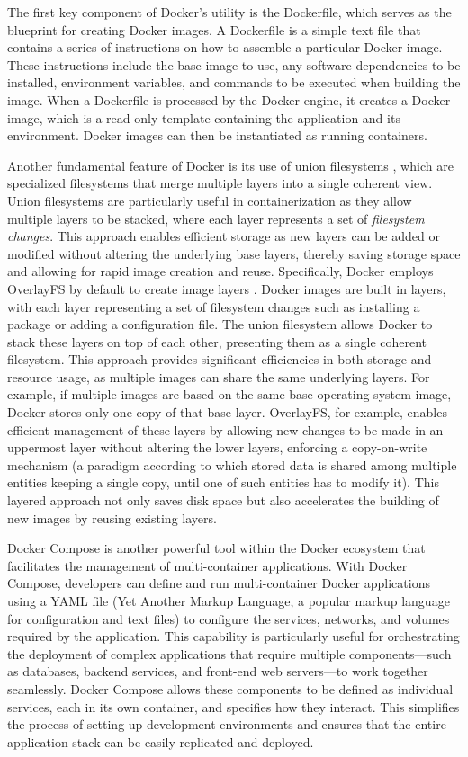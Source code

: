 The first key component of Docker's utility is the Dockerfile, which serves as the blueprint for creating Docker images. A Dockerfile is a simple text file that contains a series of instructions on how to assemble a particular Docker image. These instructions include the base image to use, any software dependencies to be installed, environment variables, and commands to be executed when building the image. When a Dockerfile is processed by the Docker engine, it creates a Docker image, which is a read-only template containing the application and its environment. Docker images can then be instantiated as running containers.

Another fundamental feature of Docker is its use of union filesystems \cite{dua_performance_2016}, which are specialized filesystems that merge multiple layers into a single coherent view. Union filesystems are particularly useful in containerization as they allow multiple layers to be stacked, where each layer represents a set of \emph{filesystem changes}. This approach enables efficient storage as new layers can be added or modified without altering the underlying base layers, thereby saving storage space and allowing for rapid image creation and reuse. Specifically, Docker employs OverlayFS by default to create image layers \cite{mizusawa_performance_2017}. Docker images are built in layers, with each layer representing a set of filesystem changes such as installing a package or adding a configuration file. The union filesystem allows Docker to stack these layers on top of each other, presenting them as a single coherent filesystem. This approach provides significant efficiencies in both storage and resource usage, as multiple images can share the same underlying layers. For example, if multiple images are based on the same base operating system image, Docker stores only one copy of that base layer. OverlayFS, for example, enables efficient management of these layers by allowing new changes to be made in an uppermost layer without altering the lower layers, enforcing a copy-on-write mechanism (a paradigm according to which stored data is shared among multiple entities keeping a single copy, until one of such entities has to modify it). This layered approach not only saves disk space but also accelerates the building of new images by reusing existing layers.

Docker Compose \cite{docker_inc_docker_nodate-3} is another powerful tool within the Docker ecosystem that facilitates the management of multi-container applications. With Docker Compose, developers can define and run multi-container Docker applications using a YAML file (Yet Another Markup Language, a popular markup language for configuration and text files) to configure the services, networks, and volumes required by the application. This capability is particularly useful for orchestrating the deployment of complex applications that require multiple components—such as databases, backend services, and front-end web servers—to work together seamlessly. Docker Compose allows these components to be defined as individual services, each in its own container, and specifies how they interact. This simplifies the process of setting up development environments and ensures that the entire application stack can be easily replicated and deployed.

